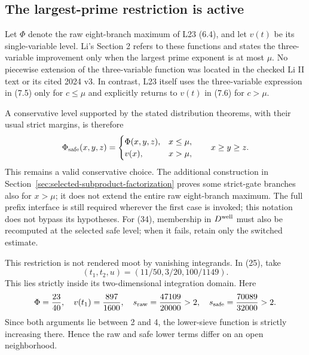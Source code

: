 \documentclass[11pt]{article}
\begin{document}
\subsection{The largest-prime restriction is active}
\label{sec:external-largest-prime-resolution}

Let $\Phi$ denote the raw eight-branch maximum of L23 (6.4),
and let $v(t)$ be its single-variable level. Li's Section 2
refers to these functions and states the three-variable
improvement only when the largest prime exponent is at most
$\mu$. No piecewise extension of the three-variable function
was located in the checked Li II text or its cited 2024 v3.
In contrast, L23 itself uses the three-variable expression in
(7.5) only for $c\le\mu$ and explicitly returns to $v(t)$
in (7.6) for $c>\mu$.

A conservative level supported by the stated distribution
theorems, with their usual strict margins, is therefore
\[
 \Phi_{\rm safe}(x,y,z)=
 \begin{cases}
  \Phi(x,y,z),&x\le\mu,\\
  v(x),&x>\mu,
 \end{cases}
 \qquad x\ge y\ge z.
\]
This remains a valid conservative choice. The additional construction
in Section~\ref{sec:selected-subproduct-factorization} proves some
strict-gate branches also for $x>\mu$; it does not extend the entire
raw eight-branch maximum. The full prefix interface is still required
wherever the first case is invoked; this notation does not bypass
its hypotheses.
For (34), membership in $D^{\rm well}$ must also be recomputed
at the selected safe level; when it fails, retain only the
switched estimate.

This restriction is not rendered moot by vanishing integrands.
In (25), take
\[
 (t_1,t_2,u)=(11/50,3/20,100/1149).
\]
This lies strictly inside its two-dimensional integration
domain. Here
\[
 \Phi=\frac{23}{40},\quad v(t_1)=\frac{897}{1600},\quad
 s_{\rm raw}=\frac{47109}{20000}>2,\quad
 s_{\rm safe}=\frac{70089}{32000}>2.
\]
Since both arguments lie between 2 and 4, the lower-sieve
function is strictly increasing there. Hence the raw and safe
lower terms differ on an open neighborhood.
\end{document}
